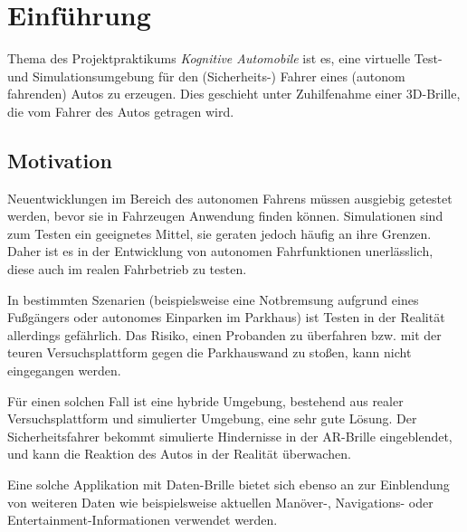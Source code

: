 
\section{Einführung}
\label{einleitung_sec}

Thema des Projektpraktikums \emph{Kognitive Automobile} ist es, eine virtuelle Test- und Simulationsumgebung für den (Sicherheits-) Fahrer eines (autonom fahrenden) Autos zu erzeugen.
Dies geschieht unter Zuhilfenahme einer 3D-Brille, die vom Fahrer des Autos getragen wird.



\subsection{Motivation}
\label{motivation_subsec}


Neuentwicklungen im Bereich des autonomen Fahrens müssen ausgiebig getestet werden, bevor sie in  Fahrzeugen Anwendung finden können.
Simulationen sind zum Testen ein geeignetes Mittel, sie geraten jedoch häufig an ihre Grenzen.
Daher ist es in der Entwicklung von autonomen Fahrfunktionen unerlässlich, diese auch im realen Fahrbetrieb zu testen.

In bestimmten Szenarien (beispielsweise eine Notbremsung aufgrund eines Fußgängers oder autonomes Einparken im Parkhaus) ist Testen in der Realität allerdings gefährlich.
Das Risiko, einen Probanden zu überfahren bzw. mit der teuren Versuchsplattform gegen die Parkhauswand zu stoßen, kann nicht eingegangen werden.

Für einen solchen Fall ist eine hybride Umgebung, bestehend aus realer Versuchsplattform und simulierter Umgebung, eine sehr gute Lösung.
Der Sicherheitsfahrer bekommt simulierte Hindernisse in der AR-Brille eingeblendet, und kann die Reaktion des Autos in der Realität überwachen.

Eine solche Applikation mit Daten-Brille bietet sich ebenso an zur Einblendung von weiteren Daten wie beispielsweise aktuellen Manöver-, Navigations- oder Entertainment-Informationen verwendet werden.




